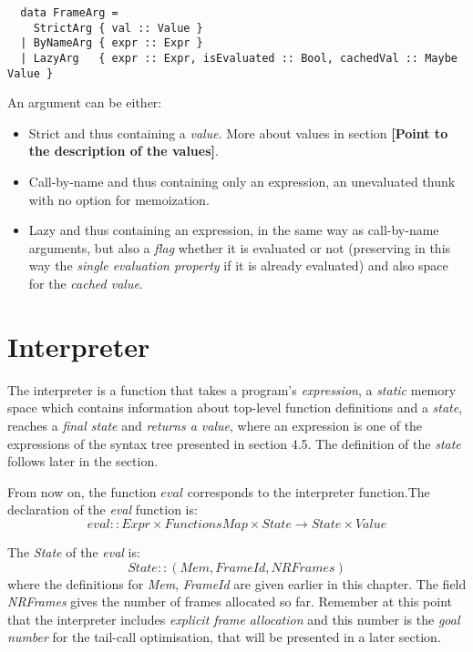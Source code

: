 \documentclass[diploma]{softlab-thesis}
\begin{document}
\begin{verbatim}
  data FrameArg = 
    StrictArg { val :: Value }
  | ByNameArg { expr :: Expr }
  | LazyArg   { expr :: Expr, isEvaluated :: Bool, cachedVal :: Maybe Value }  
\end{verbatim}

An argument can be either:
\begin{itemize}
  \item Strict and thus containing a \textit{value}. More about values in section \textbf{[Point to the description of the values]}.
  \item Call-by-name and thus containing only an expression, an unevaluated thunk with no option for 
  memoization.
  \item Lazy and thus containing an expression, in the same way as call-by-name arguments, 
  but also a \textit{flag} whether it is evaluated or not (preserving in this way the \textit{single evaluation property} if 
  it is already evaluated) and also space for the \textit{cached value}.
\end{itemize}

\section{Interpreter}

The interpreter is a function that takes a program's \textit{expression}, a \textit{static} memory space which contains 
information about top-level function definitions and a \textit{state}, 
reaches a \textit{final state} and \textit{returns a value}, where an expression is one of the expressions of the syntax 
tree presented in section 4.5. The definition of the \textit{state} follows later in the section.

From now on, the function $\mathit{eval}$ corresponds to the interpreter function.The declaration of the \textit{eval} 
function is:
\[
  \mathit{eval} :: \mathit{Expr} \times \mathit{FunctionsMap} \times State \rightarrow State \times Value
\]

The \textit{State} of the \textit{eval} is:
\[
  State :: (Mem, FrameId, NRFrames)
\] 
where the definitions for \textit{Mem}, \textit{FrameId} are given earlier in this chapter. The field \textit{NRFrames}
gives the number of frames allocated so far. Remember at this point that the interpreter includes \textit{explicit frame 
allocation} and this number is the \textit{goal number} for the tail-call optimisation, that will be presented in a 
later section.
\end{document}
